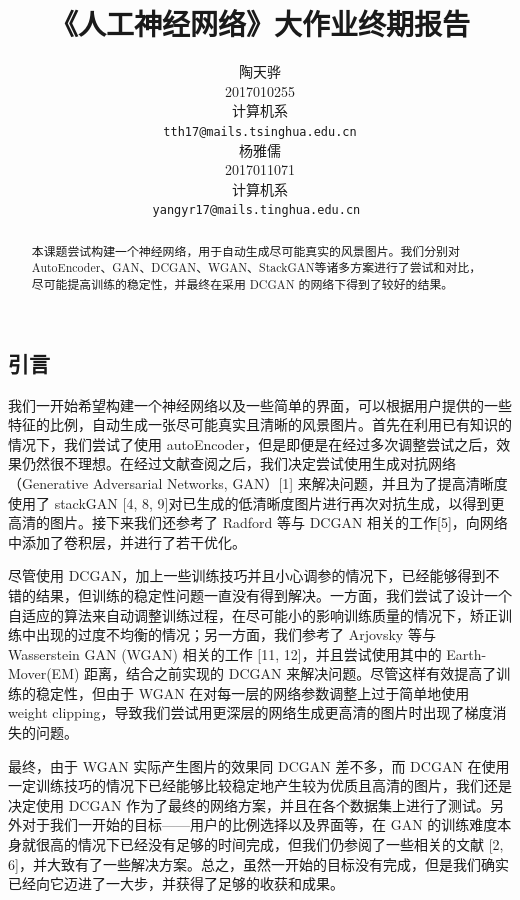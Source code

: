 \documentclass{article}
\title{《人工神经网络》大作业终期报告}
\author{%
  陶天骅 \\
  2017010255 \\
  计算机系 \\
  \texttt{tth17@mails.tsinghua.edu.cn} \\
  \And
  杨雅儒\\
  2017011071 \\
  计算机系 \\
  \texttt{yangyr17@mails.tinghua.edu.cn
  } \\
}
\begin{document}
\begin{CJK*}{UTF8}{gbsn}
\maketitle


\begin{abstract}

本课题尝试构建一个神经网络，用于自动生成尽可能真实的风景图片。我们分别对AutoEncoder、GAN、DCGAN、WGAN、StackGAN等诸多方案进行了尝试和对比，尽可能提高训练的稳定性，并最终在采用 DCGAN 的网络下得到了较好的结果。

\end{abstract}

\section{引言}

  我们一开始希望构建一个神经网络以及一些简单的界面，可以根据用户提供的一些特征的比例，自动生成一张尽可能真实且清晰的风景图片。首先在利用已有知识的情况下，我们尝试了使用 autoEncoder，但是即便是在经过多次调整尝试之后，效果仍然很不理想。在经过文献查阅之后，我们决定尝试使用生成对抗网络（Generative Adversarial Networks, GAN）[1] 来解决问题，并且为了提高清晰度使用了 stackGAN [4, 8, 9]对已生成的低清晰度图片进行再次对抗生成，以得到更高清的图片。接下来我们还参考了 Radford 等与 DCGAN 相关的工作[5]，向网络中添加了卷积层，并进行了若干优化。

  尽管使用 DCGAN，加上一些训练技巧并且小心调参的情况下，已经能够得到不错的结果，但训练的稳定性问题一直没有得到解决。一方面，我们尝试了设计一个自适应的算法来自动调整训练过程，在尽可能小的影响训练质量的情况下，矫正训练中出现的过度不均衡的情况；另一方面，我们参考了 Arjovsky 等与 Wasserstein GAN (WGAN) 相关的工作 [11, 12]，并且尝试使用其中的 Earth-Mover(EM) 距离，结合之前实现的 DCGAN 来解决问题。尽管这样有效提高了训练的稳定性，但由于 WGAN 在对每一层的网络参数调整上过于简单地使用 weight clipping，导致我们尝试用更深层的网络生成更高清的图片时出现了梯度消失的问题。

  最终，由于 WGAN 实际产生图片的效果同 DCGAN 差不多，而 DCGAN 在使用一定训练技巧的情况下已经能够比较稳定地产生较为优质且高清的图片，我们还是决定使用 DCGAN 作为了最终的网络方案，并且在各个数据集上进行了测试。另外对于我们一开始的目标——用户的比例选择以及界面等，在 GAN 的训练难度本身就很高的情况下已经没有足够的时间完成，但我们仍参阅了一些相关的文献 [2, 6]，并大致有了一些解决方案。总之，虽然一开始的目标没有完成，但是我们确实已经向它迈进了一大步，并获得了足够的收获和成果。


\end{CJK*}
\end{document}
